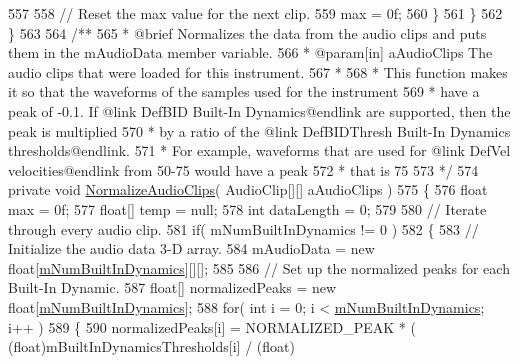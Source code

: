 \begin{DoxyCodeInclude}
{557 
558                 \textcolor{comment}{// Reset the max value for the next clip.}
559                 max = 0f;
560             \}
561         \}
562     \}
563 \textcolor{comment}{}
564 \textcolor{comment}{    /**}
565 \textcolor{comment}{     * @brief Normalizes the data from the audio clips and puts them in the mAudioData member variable.}
566 \textcolor{comment}{     * @param[in] aAudioClips The audio clips that were loaded for this instrument.}
567 \textcolor{comment}{     * }
568 \textcolor{comment}{     * This function makes it so that the waveforms of the samples used for the instrument}
569 \textcolor{comment}{     * have a peak of -0.1. If @link DefBID Built-In Dynamics@endlink are supported, then the peak is
       multiplied}
570 \textcolor{comment}{     * by a ratio of the @link DefBIDThresh Built-In Dynamics thresholds@endlink. }
571 \textcolor{comment}{     * For example, waveforms that are used for @link DefVel velocities@endlink from 50-75 would have a
       peak }
572 \textcolor{comment}{     * that is 75%
573 \textcolor{comment}{     */}
574     \textcolor{keyword}{private} \textcolor{keywordtype}{void} \hyperlink{group___v_i_base_priv_func_ga0262de8cfb1e671b01ba76de2e9d140a}{NormalizeAudioClips}( AudioClip[][] aAudioClips )
575     \{
576         \textcolor{keywordtype}{float} max = 0f;
577         \textcolor{keywordtype}{float}[] temp = null;
578         \textcolor{keywordtype}{int} dataLength = 0;
579 
580         \textcolor{comment}{// Iterate through every audio clip.}
581         \textcolor{keywordflow}{if}( mNumBuiltInDynamics != 0 )
582         \{
583             \textcolor{comment}{// Initialize the audio data 3-D array.}
584             mAudioData = \textcolor{keyword}{new} \textcolor{keywordtype}{float}[\hyperlink{group___v_i_base_pro_var_gac265f64f759d267ee1e1680f8d387011}{mNumBuiltInDynamics}][][];
585 
586             \textcolor{comment}{// Set up the normalized peaks for each Built-In Dynamic.}
587             \textcolor{keywordtype}{float}[] normalizedPeaks = \textcolor{keyword}{new} \textcolor{keywordtype}{float}[\hyperlink{group___v_i_base_pro_var_gac265f64f759d267ee1e1680f8d387011}{mNumBuiltInDynamics}];
588             \textcolor{keywordflow}{for}( \textcolor{keywordtype}{int} i = 0; i < \hyperlink{group___v_i_base_pro_var_gac265f64f759d267ee1e1680f8d387011}{mNumBuiltInDynamics}; i++ )
589             \{
590                 normalizedPeaks[i] = NORMALIZED\_PEAK * ( (float)mBuiltInDynamicsThresholds[i] / (\textcolor{keywordtype}{float})
}}
\end{DoxyCodeInclude}
